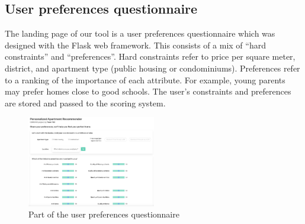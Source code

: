 \documentclass[a4paper, 11pt]{article}
\begin{document}

    \subsection{User preferences questionnaire}
    
    The landing page of our tool is a user preferences questionnaire which was designed with the Flask web framework. This consists of a mix of “hard constraints” and “preferences”. Hard constraints refer to price per square meter, district, and apartment type (public housing or condominiums). Preferences refer to a ranking of the importance of each attribute. For example, young parents may prefer homes close to good schools. The user's constraints and preferences are stored and passed to the scoring system.
    
   \begin{figure}[h]
   \centering
   \includegraphics[width={0.5\textwidth}]{questionnaire.png}
   \caption{Part of the user preferences questionnaire}
   \end{figure}
    
\end{document}
